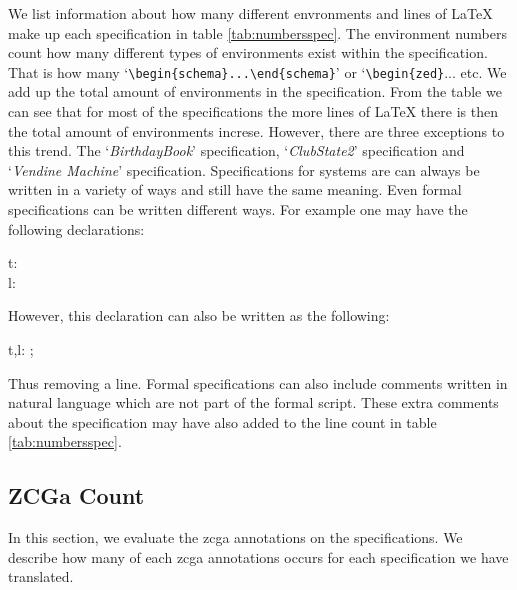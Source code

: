 We list information about how many different envronments and lines of \LaTeX{} make up each specification in table \ref{tab:numbersspec}. The environment numbers count how many different types of environments exist within the specification. That is how many `\verb|\begin{schema}...\end{schema}|' or `\verb|\begin{zed}|... etc. We add up the total amount of environments in the specification. From the table we can see that for most of the specifications the more lines of \LaTeX{} there is then the total amount of environments increse. However, there are three exceptions to this trend. The `\emph{BirthdayBook}' specification, `\emph{ClubState2}' specification and `\emph{Vendine Machine}' specification. Specifications for systems are can always be written in a variety of ways and still have the same meaning. Even formal specifications can be written different ways. For example one may have the following declarations:

\begin{zed}
t:\nat \\
l: \nat 
\end{zed}

However, this declaration can also be written as the following:
\begin{zed}
t,l: ;\nat
\end{zed}

Thus removing a line. Formal specifications can also include comments written in natural language which are not part of the formal script. These extra comments about the specification may have also added to the line count in table \ref{tab:numbersspec}.

\subsection{ZCGa Count}

In this section, we evaluate the \gls{zcga} annotations on the specifications. We describe how many of each \gls{zcga} annotations occurs for each specification we have translated.

